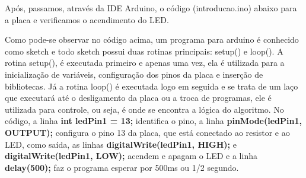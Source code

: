 Após, passamos, através da IDE Arduino, o código (introducao.ino) abaixo para a placa e verificamos o acendimento do LED.



Como pode-se observar no código acima, um programa para arduino é conhecido como sketch e todo sketch possui duas rotinas principais: setup() e loop(). A rotina setup(), é executada primeiro e apenas uma vez, ela é utilizada para a inicialização de variáveis, configuração dos pinos da placa e inserção de bibliotecas. Já a rotina loop() é executada logo em seguida e se trata de um laço que executará até o desligamento da placa ou a troca de programas, ele é utilizada para controle, ou seja, é onde se encontra a lógica do algoritmo. No código, a linha \textbf{int ledPin1 = 13;} identifica o pino, a linha \textbf{pinMode(ledPin1, OUTPUT);} configura o pino 13 da placa, que está conectado ao resistor e ao LED, como saída, as linhas \textbf{digitalWrite(ledPin1, HIGH);} e \textbf{digitalWrite(ledPin1, LOW);} acendem e apagam o LED e a linha \textbf{delay(500);} faz o programa esperar por 500ms ou 1/2 segundo. 